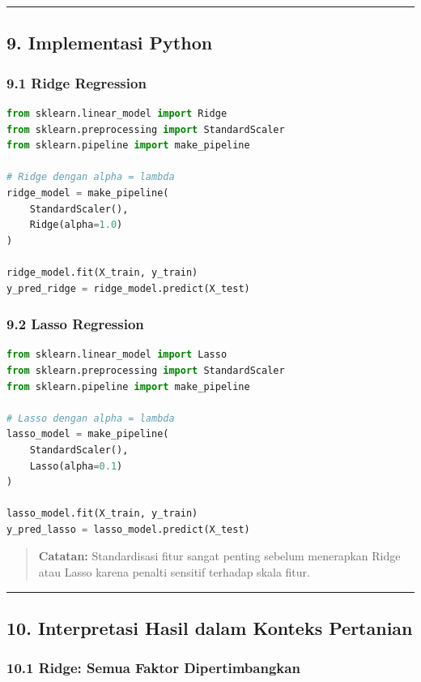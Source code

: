 \documentclass[12pt,a4paper]{article}
\begin{document}
\hrule


\subsection{9. Implementasi Python}

\subsubsection{9.1 Ridge Regression}

\begin{lstlisting}[language=Python]
from sklearn.linear_model import Ridge
from sklearn.preprocessing import StandardScaler
from sklearn.pipeline import make_pipeline

# Ridge dengan alpha = lambda
ridge_model = make_pipeline(
    StandardScaler(),
    Ridge(alpha=1.0)
)

ridge_model.fit(X_train, y_train)
y_pred_ridge = ridge_model.predict(X_test)
\end{lstlisting}

\subsubsection{9.2 Lasso Regression}

\begin{lstlisting}[language=Python]
from sklearn.linear_model import Lasso
from sklearn.preprocessing import StandardScaler
from sklearn.pipeline import make_pipeline

# Lasso dengan alpha = lambda
lasso_model = make_pipeline(
    StandardScaler(),
    Lasso(alpha=0.1)
)

lasso_model.fit(X_train, y_train)
y_pred_lasso = lasso_model.predict(X_test)
\end{lstlisting}

\begin{quote}
\textbf{Catatan:} Standardisasi fitur sangat penting sebelum menerapkan Ridge atau Lasso karena penalti sensitif terhadap skala fitur.\end{quote}


\hrule


\subsection{10. Interpretasi Hasil dalam Konteks Pertanian}

\subsubsection{10.1 Ridge: Semua Faktor Dipertimbangkan}
\end{document}
